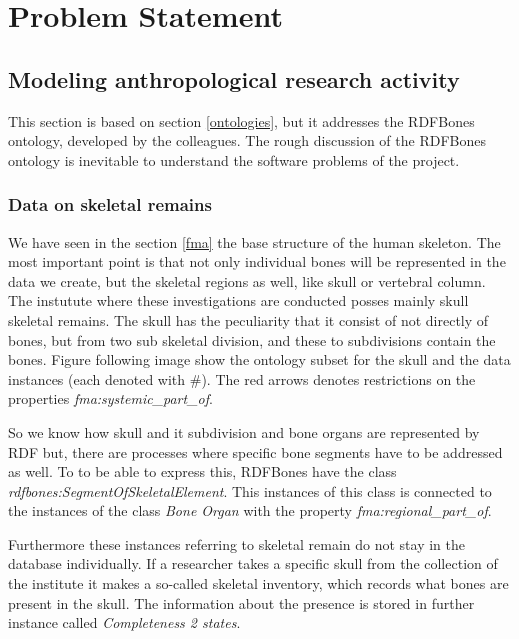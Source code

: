 \chapter{Problem Statement}

\section{Modeling anthropological research activity}

This section is based on section \ref{ontologies}, but it addresses the RDFBones ontology, developed by the colleagues. The rough discussion of the RDFBones ontology is inevitable to understand the software problems of the project. 



\subsection{Data on skeletal remains}


We have seen in the section \ref{fma} the base structure of the human skeleton. The most important point is that not only individual bones will be represented in the data we create, but the skeletal regions as well, like skull or vertebral column. The instutute where these investigations are conducted posses mainly skull skeletal remains. The skull has the peculiarity that it consist of not directly of bones, but from two sub skeletal division, and these to subdivisions contain the bones. Figure  following image show the ontology subset for the skull and the data instances (each denoted with \#). The red arrows denotes restrictions on the properties \textit{fma:systemic\_part\_of}.  


So we know how skull and it subdivision and bone organs are represented by RDF but, there are processes where specific bone segments have to be addressed as well. To to be able to express this, RDFBones have the class \textit{rdfbones:SegmentOfSkeletalElement}. This instances of this class is connected to the instances of the class \textit{Bone Organ} with the property \textit{fma:regional\_part\_of}. 




Furthermore these instances referring to skeletal remain do not stay in the database individually. If a researcher takes a specific skull from the collection of the institute it makes a so-called skeletal inventory, which records what bones are present in the skull. The information about the presence is stored in further instance called \textit{Completeness 2 states}.  


